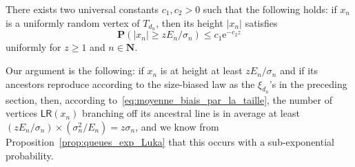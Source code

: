 \documentclass[AHL,Unicode,longabstracts,published]{cedram}
\newcommand{\ensembles}[1]{\mathbf{#1}}
\newcommand{\N}{\ensembles{N}}
\renewcommand{\P}{\ensembles{P}}
\renewcommand{\Pr}[1]{\P\left(#1\right)}
\newcommand{\1}{\ensembles{1}}
\renewcommand{\le}{\leqslant}
\renewcommand{\ge}{\geqslant}
\newcommand{\LR}{\mathsf{LR}}
\newcommand{\e}{\mathrm{e}}
\newcommand{\tn}{T_{d_n}}
\newcommand{\edges}{E}
\begin{document}
\begin{prop}\label{prop:queues_exp_hauteur_typique_arbre}
There exists two universal constants $c_1, c_2 > 0$ such that the following holds: if $x_n$ is a uniformly random vertex of $\tn$, then its height $|x_n|$ satisfies
\[
\Pr{|x_n| \ge z \edges_n / \sigma_n} \le c_1 \e^{- c_2 z}
\]
uniformly for $z \ge 1$ and $n \in \N$.
\end{prop}


Our argument is the following: if $x_n$ is at height at least $z \edges_n / \sigma_n$ and if its ancestors reproduce according to the size-biased law as the $\xi_{d_n}$'s in the preceding section, then, according to~\eqref{eq:moyenne_biais_par_la_taille}, the number of vertices $\LR(x_n)$ branching off its ancestral line is in average at least $(z \edges_n / \sigma_n) \times (\sigma_n^2 / \edges_n) = z \sigma_n$, and we know from Proposition~\ref{prop:queues_exp_Luka} that this occurs with a sub-exponential probability.
\end{document}
